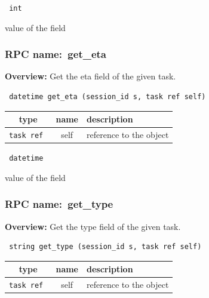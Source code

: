 \vspace{0.3cm}

{\tt 
int
}


value of the field
\vspace{0.3cm}
\vspace{0.3cm}
\vspace{0.3cm}
\subsubsection{RPC name:~get\_eta}

{\bf Overview:} 
Get the eta field of the given task.

\begin{verbatim} datetime get_eta (session_id s, task ref self)\end{verbatim}



 
\vspace{0.3cm}
\begin{tabular}{|c|c|p{7cm}|}
 \hline
{\bf type} & {\bf name} & {\bf description} \\ \hline
{\tt task ref } & self & reference to the object \\ \hline 

\end{tabular}

\vspace{0.3cm}

{\tt 
datetime
}


value of the field
\vspace{0.3cm}
\vspace{0.3cm}
\vspace{0.3cm}
\subsubsection{RPC name:~get\_type}

{\bf Overview:} 
Get the type field of the given task.

\begin{verbatim} string get_type (session_id s, task ref self)\end{verbatim}



 
\vspace{0.3cm}
\begin{tabular}{|c|c|p{7cm}|}
 \hline
{\bf type} & {\bf name} & {\bf description} \\ \hline
{\tt task ref } & self & reference to the object \\ \hline 

\end{tabular}

